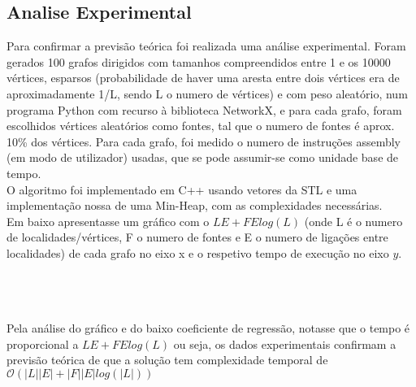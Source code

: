 \documentclass[12pt]{article}
\begin{document}
\subsection{Analise Experimental}
Para confirmar a previsão teórica foi realizada uma análise experimental. Foram gerados 100 grafos dirigidos com tamanhos compreendidos entre 1 e os 10000 vértices, esparsos (probabilidade de haver uma aresta entre dois vértices era de aproximadamente 1/L, sendo L o numero de vértices) e com peso aleatório, num programa Python com recurso à biblioteca NetworkX\cite{hagberg-2008-exploring}, e para cada grafo, foram escolhidos vértices aleatórios como fontes, tal que o numero de fontes é aprox. 10\% dos vértices. Para cada grafo, foi medido o numero de instruções assembly (em modo de utilizador) usadas, que se pode assumir-se como unidade base de tempo.\\
\indent O algoritmo foi implementado em C++ usando vetores da STL e uma implementação nossa de uma Min-Heap, com as complexidades necessárias.\\
\indent Em baixo apresentasse um gráfico com o $LE + FElog(L)$ (onde L é o numero de localidades/vértices, F o numero de fontes e E o numero de ligações entre localidades) de cada grafo no eixo x e o respetivo tempo de execução no eixo $y$.\\
\\
\\\\
Pela análise do gráfico e do baixo coeficiente de regressão, notasse que o tempo é proporcional a $LE + FElog(L)$  ou seja, os dados experimentais confirmam a previsão teórica de que a solução tem complexidade temporal de $\mathcal{O}(|L||E| + |F||E|log(|L|))$\\
\pagebreak
{}

\end{document}
